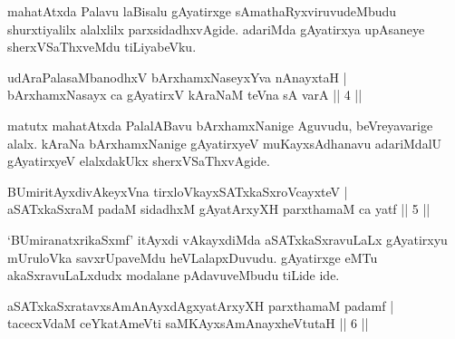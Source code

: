 \begin{artha} 
mahatAtxda Palavu laBisalu gAyatirxge sAmathaRyxviruvu\-\break deMbudu 
shurxtiyalilx alalxlilx parxsidadhxvAgide. adariMda gAyatirxya 
upAsaneye sherxVSaThxveMdu tiLiyabeVku.
\end{artha}

\begin{shl}
udAraPalasaMbanodhxV bArxhamxNaseyxYva nAnayxtaH | \\
bArxhamxNasayx ca gAyatirxV kAraNaM teVna sA varA \hfill ||  4 || 
\end{shl}

\begin{artha} 
matutx mahatAtxda PalalABavu bArxhamxNanige Aguvudu, beVreyavarige 
alalx. kAraNa bArxhamxNanige gAyatirxyeV muKayxsAdhanavu adariMdalU 
gAyatirxyeV elalxdakUkx sherxVSaThxvAgide.
\end{artha}

\begin{shl}
BUmiritAyxdivAkeyxVna tirxloVkayxSATxkaSxroVcayxteV | \\
aSATxkaSxraM padaM sidadhxM gAyatArxyXH parxthamaM ca yatf \hfill ||  5 || 
\end{shl}

\begin{artha} 
`BUmiranatxrikaSxmf' itAyxdi vAkayxdiMda aSATxkaSxravuLaLx gAyatirxyu 
mUruloVka savxrUpaveMdu heVLalapxDuvudu. gAyatirxge eMTu 
akaSxravuLaLxdudx modalane pAdavuveMbudu tiLide ide.
\end{artha}

\begin{shl}
aSATxkaSxratavxsAmAnAyxdAgxyatArxyXH parxthamaM padamf  | \\
tacecxVdaM ceYkatAmeVti saMKAyxsAmAnayxheVtutaH \hfill ||  6 || 
\end{shl}

